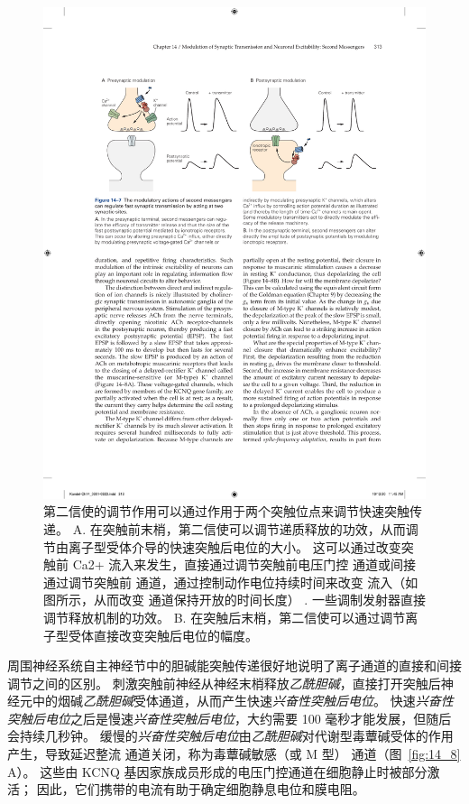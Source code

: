 \begin{figure}[htbp]
	\centering
	\includegraphics[width=0.9\linewidth]{chap14/fig_14_7}
	\caption{第二信使的调节作用可以通过作用于两个突触位点来调节快速突触传递。 A. 在突触前末梢，第二信使可以调节递质释放的功效，从而调节由离子型受体介导的快速突触后电位的大小。 这可以通过改变突触前 Ca2+ 流入来发生，直接通过调节突触前电压门控  通道或间接通过调节突触前  通道，通过控制动作电位持续时间来改变  流入（如图所示，从而改变  通道保持开放的时间长度） . 一些调制发射器直接调节释放机制的功效。 B. 在突触后末梢，第二信使可以通过调节离子型受体直接改变突触后电位的幅度。}
	\label{fig:14_7}
\end{figure}


周围神经系统自主神经节中的胆碱能突触传递很好地说明了离子通道的直接和间接调节之间的区别。
刺激突触前神经从神经末梢释放\textit{乙酰胆碱}，直接打开突触后神经元中的烟碱\textit{乙酰胆碱}受体通道，从而产生快速\textit{兴奋性突触后电位}。
快速\textit{兴奋性突触后电位}之后是慢速\textit{兴奋性突触后电位}，大约需要 100 毫秒才能发展，但随后会持续几秒钟。
缓慢的\textit{兴奋性突触后电位}由\textit{乙酰胆碱}对代谢型毒蕈碱受体的作用产生，导致延迟整流  通道关闭，称为毒蕈碱敏感（或 M 型） 通道（图~\ref{fig:14_8} A）。
这些由 KCNQ 基因家族成员形成的电压门控通道在细胞静止时被部分激活；
因此，它们携带的电流有助于确定细胞静息电位和膜电阻。


